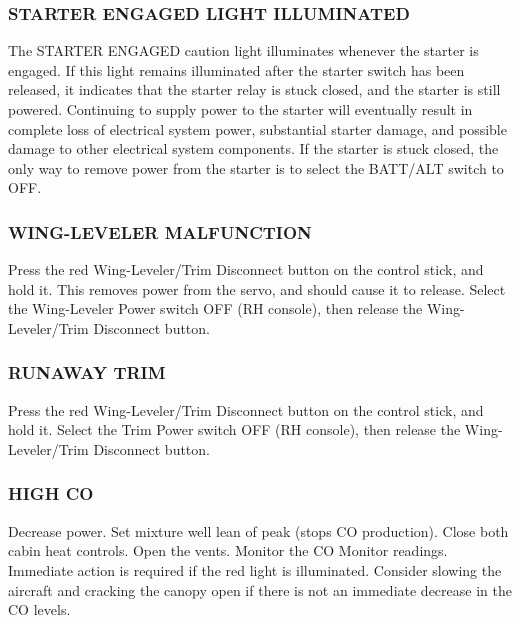 \subsubsection{STARTER ENGAGED LIGHT ILLUMINATED}
The STARTER ENGAGED caution light illuminates whenever the starter is engaged.  If this light remains illuminated after
the starter switch has been released, it indicates that the starter relay is stuck closed, and the starter is still
powered.
 Continuing to supply power to the
starter will eventually result in complete loss of electrical system power, substantial starter damage, and possible
damage to other electrical system components.  If the starter is stuck closed, the only way to remove power from the
starter is to select the BATT/ALT switch to OFF.


\subsubsection{WING-LEVELER MALFUNCTION}

Press the red Wing-Leveler/Trim Disconnect button on the control stick, and hold it.  This removes power from the servo, and should cause it to release.
Select the Wing-Leveler Power switch OFF (RH console), then release the Wing-Leveler/Trim Disconnect button.  

\subsubsection{RUNAWAY TRIM}

Press the red Wing-Leveler/Trim Disconnect button on the control stick, and hold it.  Select the Trim Power switch OFF (RH console), then release the Wing-Leveler/Trim Disconnect button.

\subsubsection{HIGH CO}

Decrease power.  Set mixture well lean of peak (stops CO production).  Close both cabin heat controls.  Open the vents.  Monitor the CO Monitor readings.  
Immediate action is required if the red light is illuminated.  
Consider slowing the aircraft and cracking the canopy open if there is not an immediate decrease in the CO levels.

